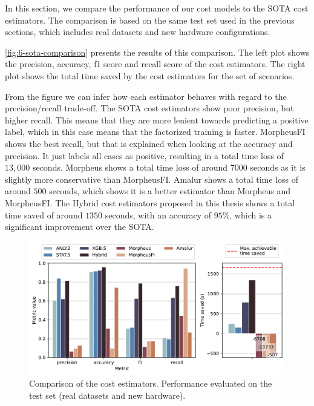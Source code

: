 In this section, we compare the performance of our cost models to the SOTA cost estimators. The comparison is based on the same test set used in the previous sections, which includes real datasets and new hardware configurations.

\autoref{fig:6-sota-comparison} presents the results of this comparison. The left plot shows the precision, accuracy, f1 score and recall score of the cost estimators. The right plot shows the total time saved by the cost estimators for the set of scenarios.

From the figure we can infer how each estimator behaves with regard to the precision/recall trade-off. The SOTA cost estimators show poor precision, but higher recall. This means that they are more lenient towards predicting a positive label, which in this case means that the factorized training is faster. MorpheusFI \cite{MorpheusFI} shows the best recall, but that is explained when looking at the accuracy and precision. It just labels all cases as positive, resulting in a total time loss of $13,000$ seconds. Morpheus \cite{orion_learning_gen_lin_models} shows a total time loss of around $7000$ seconds as it is slightly more conservative than MorpheusFI. Amalur \cite{amalur} shows a total time loss of around $500$ seconds, which shows it is a better estimator than Morpheus and MorpheusFI. The Hybrid cost estimators proposed in this thesis shows a total time saved of around $1350$ seconds, with an accuracy of $95\%$, which is a significant improvement over the SOTA.

\begin{figure}[ht]
    \centering
    \includegraphics[width=\linewidth]{chapters/06_evaluation/figures/eval_sota_results.pdf}
    \caption[Cost estimator comparison vs. SOTA]{Comparison of the cost estimators. Performance evaluated on the test set (real datasets and new hardware).}
    \label{fig:6-sota-comparison}
\end{figure}


